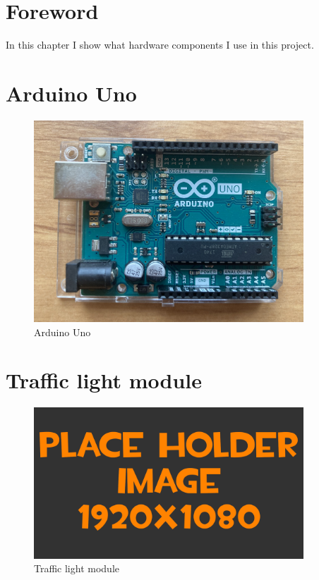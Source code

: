 
\section{Foreword}
In this chapter I show what hardware components I use in this project.

\section{Arduino Uno}

\begin{figure}[H]
	\centering
	\includegraphics[width=0.9\textwidth]{pictures/arduino.jpeg}
	\caption{Arduino Uno}
	\label{fig:arduinoMega}
\end{figure}

\section{Traffic light module}

\begin{figure}[H]
	\centering
	\includegraphics[width=0.9\textwidth]{pictures/image.png}
	\caption{Traffic light module}
\end{figure}

